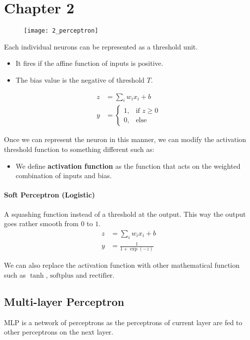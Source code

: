 \newpage
\section{Chapter 2}

\begin{figure}[H]
	\centering
	\texttt{[image: 2\_perceptron]}
\end{figure}

\hfill\break
Each individual neurons can be represented as a threshold unit.
\begin{itemize}
	\item It fires if the affine function of inputs is positive.
	\item The bias value is the negative of threshold $T$.
\end{itemize} 

\begin{align*}
	z &= \sum_{i}w_ix_i + b \\
	y &= 
\begin{cases} 
	1, & \text{if } z \geq 0 \\
	0, & \text{else }
\end{cases}
\end{align*}

\hfill\break
Once we can represent the neuron in this manner, we can modify the activation threshold function to something different such as:
\begin{itemize}
	\item We define \textbf{activation function} as the function that acts on the weighted combination of inputs and bias.
	 
\end{itemize}
\paragraph{Soft Perceptron (Logistic)}
A squashing function instead of a threshold at the output. This way the output goes rather smooth from $0$ to $1$.
\begin{align*}
	z &= \sum_{i}w_ix_i + b \\
	y &= \frac{1}{1 + \exp (-z)}
\end{align*}

\hfill\break
We can also replace the activation function with other mathematical function such as $\tanh$, $\text{softplus}$ and $\text{rectifier}$.

\subsection{Multi-layer Perceptron}
MLP is a network of perceptrons as the perceptrons of current layer are fed to other perceptrons on the next layer.

